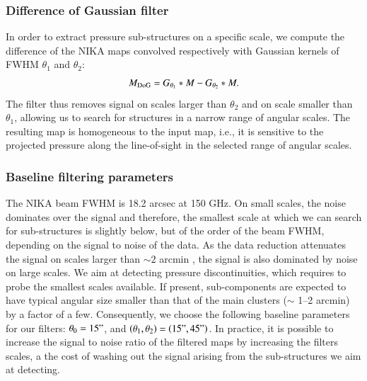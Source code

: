\documentclass[twocolumn,traditabstract]{aa}
\begin{document}
\subsubsection{Difference of Gaussian filter}
In order to extract pressure sub-structures on a specific scale, we compute the difference of the NIKA maps convolved respectively with Gaussian kernels of FWHM $\theta_1$ and $\theta_2$:
\begin{equation}
	M_{\rm DoG} = G_{\theta_1} \ast M - G_{\theta_2} \ast M.
	\label{eq:DoG_filter}
\end{equation}
The filter thus removes signal on scales larger than $\theta_2$ and on scale smaller than $\theta_1$, allowing us to search for structures in a narrow range of angular scales. The resulting map is homogeneous to the input map, i.e., it is sensitive to the projected pressure along the line-of-sight in the selected range of angular scales.

\subsubsection{Baseline filtering parameters}\label{sec:Baseline_filtering_parameters}
The NIKA beam FWHM is 18.2 arcsec at 150 GHz. On small scales, the noise dominates over the signal and therefore, the smallest scale at which we can search for sub-structures is slightly below, but of the order of the beam FWHM, depending on the signal to noise of the data. As the data reduction attenuates the signal on scales larger than $\sim 2$ arcmin \citep[see][and section \ref{sec:Systematics_and_noise_properties}]{Adam2015}, the signal is also dominated by noise on large scales. We aim at detecting pressure discontinuities, which requires to probe the smallest scales available. If present, sub-components are expected to have typical angular size smaller than that of the main clusters ($\sim$ 1--2 arcmin) by a factor of a few. Consequently, we choose the following baseline parameters for our filters: $\theta_0 = 15"$, and $\left(\theta_1, \theta_2\right) = \left(15", 45"\right)$. In practice, it is possible to increase the signal to noise ratio of the filtered maps by increasing the filters scales, a the cost of washing out the signal arising from the sub-structures we aim at detecting.

\end{document}
